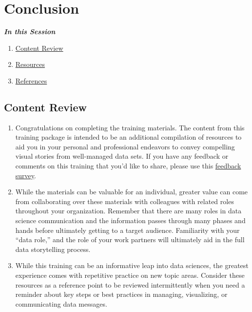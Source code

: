 \documentclass[
]{book}
\providecommand{\tightlist}{%
  \setlength{\itemsep}{0pt}\setlength{\parskip}{0pt}}
\begin{document}
\hypertarget{conclusion}{%
\chapter{Conclusion}\label{conclusion}}

\textbf{\emph{In this Session}}

\begin{enumerate}
\def\labelenumi{\arabic{enumi}.}
\tightlist
\item
  \protect\hyperlink{content-review}{Content Review}
\item
  \protect\hyperlink{resources}{Resources}
\item
  \protect\hyperlink{references}{References}
\end{enumerate}

\hypertarget{content-review}{%
\section{Content Review}\label{content-review}}

\begin{enumerate}
\def\labelenumi{\arabic{enumi}.}
\tightlist
\item
  Congratulations on completing the training materials. The content from this training package is intended to be an additional compilation of resources to aid you in your personal and professional endeavors to convey compelling visual stories from well-managed data sets. If you have any feedback or comments on this training that you'd like to share, please use this \href{https://forms.gle/QteqpUKG5dNMkBA}{feedback survey}.
\item
  While the materials can be valuable for an individual, greater value can come from collaborating over these materials with colleagues with related roles throughout your organization. Remember that there are many roles in data science communication and the information passes through many phases and hands before ultimately getting to a target audience. Familiarity with your ``data role,'' and the role of your work partners will ultimately aid in the full data storytelling process.
\item
  While this training can be an informative leap into data sciences, the greatest experience comes with repetitive practice on new topic areas. Consider these resources as a reference point to be reviewed intermittently when you need a reminder about key steps or best practices in managing, visualizing, or communicating data messages.
\end{enumerate}
\end{document}
